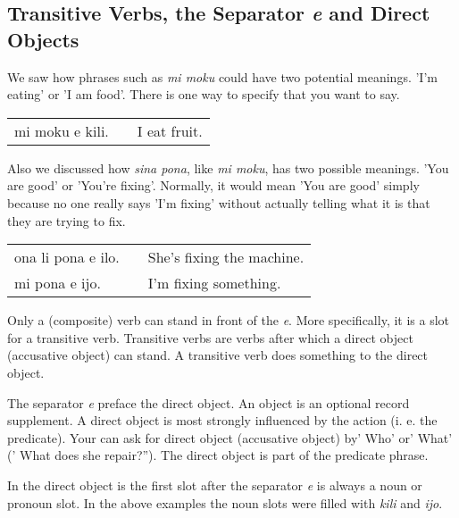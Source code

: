 %
\subsection*{Transitive Verbs, the Separator \textit{e} and Direct Objects}
%
We saw how phrases such as \textit{mi moku} could have two potential meanings. 
'I'm eating' or 'I am food'. 
There is one way to specify that you want to say. 

\begin{supertabular}{p{5,5cm}|ll}
mi moku e kili. && I eat fruit. \\
\end{supertabular} 

Also we discussed how \textit{sina pona}, like \textit{mi moku}, has two possible meanings. 'You are good' or 'You're fixing'. 
Normally, it would mean 'You are good' simply because no one really says 'I'm fixing' without actually telling what it is that they are trying to fix. 

\begin{supertabular}{p{5,5cm}|ll}
ona li pona e ilo. && She's fixing the machine. \\
mi pona e ijo. && I'm fixing something. \\
\end{supertabular} 

Only a (composite) verb can stand in front of the \textit{e}. 
More specifically, it is a slot for a transitive verb. 
Transitive verbs are verbs after which a direct object (accusative object) can stand. 
A transitive verb does something to the direct object. 

The separator \textit{e} preface the direct object.
An object is an optional record supplement. 
A direct object is most strongly influenced by the action (i. e. the predicate).
Your can ask for direct object (accusative object) by' Who' or' What' (' What does she repair?'').
The direct object is part of the predicate phrase. 

In the direct object is the first slot after the separator \textit{e} is always a noun or pronoun slot.
In the above examples the noun slots were filled with \textit{kili} and \textit{ijo}. 

%
